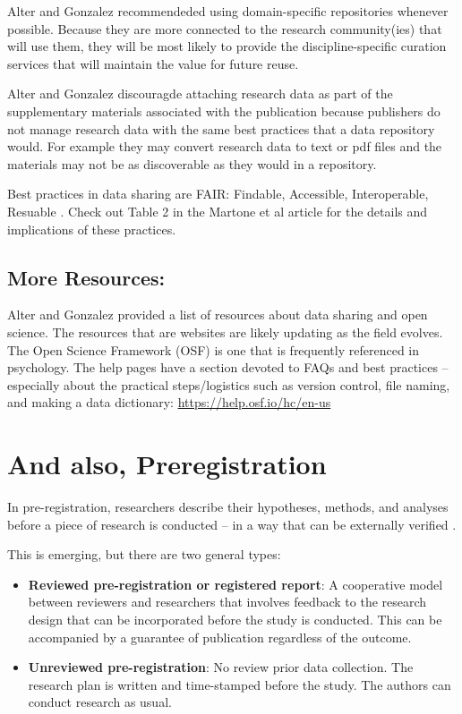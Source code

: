 \documentclass[
  english,
]{book}
\providecommand{\tightlist}{%
  \setlength{\itemsep}{0pt}\setlength{\parskip}{0pt}}
\begin{document}
Alter and Gonzalez \citeyearpar{alter_responsible_2018} recommendeded using domain-specific repositories whenever possible. Because they are more connected to the research community(ies) that will use them, they will be most likely to provide the discipline-specific curation services that will maintain the value for future reuse.

Alter and Gonzalez \citeyearpar{alter_responsible_2018} discouragde attaching research data as part of the supplementary materials associated with the publication because publishers do not manage research data with the same best practices that a data repository would. For example they may convert research data to text or pdf files and the materials may not be as discoverable as they would in a repository.

Best practices in data sharing are FAIR: Findable, Accessible, Interoperable, Resuable \citep{martone_data_2018}. Check out Table 2 in the Martone et al article for the details and implications of these practices.

\hypertarget{more-resources}{%
\subsection{More Resources:}\label{more-resources}}

Alter and Gonzalez \citeyearpar{alter_responsible_2018} provided a list of resources about data sharing and open science. The resources that are websites are likely updating as the field evolves. The Open Science Framework (OSF) is one that is frequently referenced in psychology. The help pages have a section devoted to FAQs and best practices -- especially about the practical steps/logistics such as version control, file naming, and making a data dictionary: \url{https://help.osf.io/hc/en-us}

\hypertarget{and-also-preregistration}{%
\section{And also, Preregistration}\label{and-also-preregistration}}

In pre-registration, researchers describe their hypotheses, methods, and analyses before a piece of research is conducted -- in a way that can be externally verified \citep{van_t_veer_pre-registration_2016}.

This is emerging, but there are two general types:

\begin{itemize}
\tightlist
\item
  \textbf{Reviewed pre-registration or registered report}: A cooperative model between reviewers and researchers that involves feedback to the research design that can be incorporated before the study is conducted. This can be accompanied by a guarantee of publication regardless of the outcome.
\item
  \textbf{Unreviewed pre-registration}: No review prior data collection. The research plan is written and time-stamped before the study. The authors can conduct research as usual.
\end{itemize}
\end{document}
